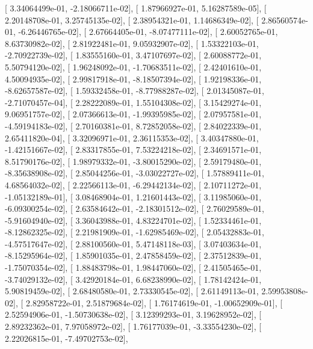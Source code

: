 \documentclass{article}
\begin{document}
       [  3.34064499e-01,  -2.18066711e-02],
       [  1.87966927e-01,   5.16287589e-05],
       [  2.20148708e-01,   3.25745135e-02],
       [  2.38954321e-01,   1.14686349e-02],
       [  2.86560574e-01,  -6.26446765e-02],
       [  2.67664405e-01,  -8.07477111e-02],
       [  2.60052765e-01,   8.63730982e-02],
       [  2.81922481e-01,   9.05932907e-02],
       [  1.53322103e-01,  -2.70922739e-02],
       [  1.83555160e-01,   3.47107697e-02],
       [  2.60088772e-01,   5.50794120e-02],
       [  1.96248092e-01,  -1.70683511e-02],
       [  2.42401610e-01,   4.50094935e-02],
       [  2.99817918e-01,  -8.18507394e-02],
       [  1.92198336e-01,  -8.62657587e-02],
       [  1.59332458e-01,  -8.77988287e-02],
       [  2.01345087e-01,  -2.71070457e-04],
       [  2.28222089e-01,   1.55104308e-02],
       [  3.15429274e-01,   9.06951757e-02],
       [  2.07366613e-01,  -1.99395985e-02],
       [  2.07957581e-01,  -4.59194183e-02],
       [  2.70160381e-01,   8.72852058e-02],
       [  2.84022339e-01,   2.65411820e-04],
       [  3.32096971e-01,   2.36115353e-02],
       [  3.40347880e-01,  -1.42151667e-02],
       [  2.83317855e-01,   7.53224218e-02],
       [  2.34691571e-01,   8.51790176e-02],
       [  1.98979332e-01,  -3.80015290e-02],
       [  2.59179480e-01,  -8.35638908e-02],
       [  2.85044256e-01,  -3.03022727e-02],
       [  1.57889411e-01,   4.68564032e-02],
       [  2.22566113e-01,  -6.29442134e-02],
       [  2.10711272e-01,  -1.05132189e-01],
       [  3.08468904e-01,   1.21601443e-02],
       [  3.11985060e-01,  -6.09300254e-02],
       [  2.63584642e-01,  -2.18301512e-02],
       [  2.76029589e-01,  -5.91604940e-02],
       [  3.36043988e-01,   4.83224701e-02],
       [  1.52334461e-01,  -8.12862325e-02],
       [  2.21981909e-01,  -1.62985469e-02],
       [  2.05432883e-01,  -4.57517647e-02],
       [  2.88100560e-01,   5.47148118e-03],
       [  3.07403634e-01,  -8.15295964e-02],
       [  1.85901035e-01,   2.47858459e-02],
       [  2.37512839e-01,  -1.75070354e-02],
       [  1.88483798e-01,   1.98447060e-02],
       [  2.41505465e-01,  -3.74029132e-02],
       [  3.42920184e-01,   6.68238990e-02],
       [  1.78142424e-01,   5.90819459e-02],
       [  2.68480580e-01,   2.73330545e-02],
       [  2.61149113e-01,   2.59953808e-02],
       [  2.82958722e-01,   2.51879684e-02],
       [  1.76174619e-01,  -1.00652909e-01],
       [  2.52594906e-01,  -1.50730638e-02],
       [  3.12399293e-01,   3.19628952e-02],
       [  2.89232362e-01,   7.97058972e-02],
       [  1.76177039e-01,  -3.33554230e-02],
       [  2.22026815e-01,  -7.49702753e-02],
\end{document}
